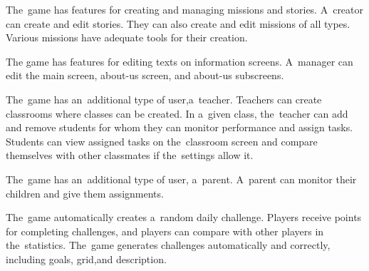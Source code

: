 \begin{enumerate}[label=\textbf{F\arabic*}, ref=\labelenumi]
     The~game has features for creating and managing missions and stories.
    A~creator can create and edit stories.
    They can also create and edit missions of all types.
    Various missions have adequate tools for their creation.

     The game has features for editing texts on information screens.
    A~manager can edit the main screen, about-us screen, and about-us subscreens.

     The~game has an~additional type of user,\linebreak{}a~teacher.
    Teachers can create classrooms where classes can be \mbox{created}.
    In a~given class, the~teacher can add and remove students for whom they can monitor performance and assign tasks.
    Students can view \mbox{assigned} tasks on the~classroom screen and compare themselves with other classmates if the~settings allow it.

     The~game has an~additional type of user, a~parent.
    A~parent can monitor their children and give them assignments.

     The~game automatically creates a~random daily challenge.
    Players receive points for completing challenges, and players can compare with other players in the~statistics.
    The~game generates challenges automatically and correctly, including goals, grid,\linebreak{}and description.
\end{enumerate}

